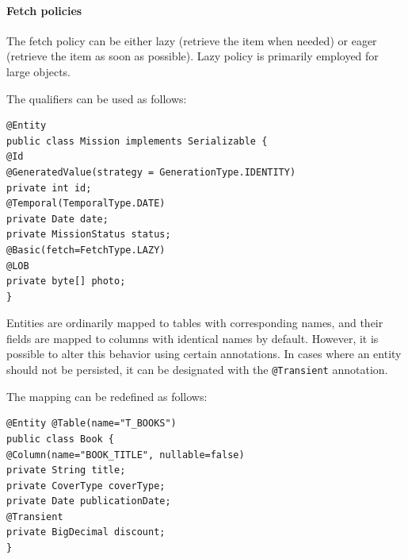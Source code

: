 \paragraph*{Fetch policies}
The fetch policy can be either lazy (retrieve the item when needed) or eager (retrieve the item as soon as possible).
Lazy policy is primarily employed for large objects.
\begin{example}
    The qualifiers can be used as follows: 
    \begin{lstlisting}[style=Java]
@Entity
public class Mission implements Serializable {
@Id
@GeneratedValue(strategy = GenerationType.IDENTITY)
private int id;
@Temporal(TemporalType.DATE)
private Date date;
private MissionStatus status;
@Basic(fetch=FetchType.LAZY)
@LOB
private byte[] photo;
}
    \end{lstlisting}
\end{example}
Entities are ordinarily mapped to tables with corresponding names, and their fields are mapped to columns with identical names by default.
However, it is possible to alter this behavior using certain annotations.
In cases where an entity should not be persisted, it can be designated with the \texttt{@Transient} annotation.
\begin{example}
    The mapping can be redefined as follows: 
    \begin{lstlisting}[style=Java]
@Entity @Table(name="T_BOOKS")
public class Book {
@Column(name="BOOK_TITLE", nullable=false)
private String title;
private CoverType coverType;
private Date publicationDate;
@Transient
private BigDecimal discount;
}
    \end{lstlisting}
\end{example}

